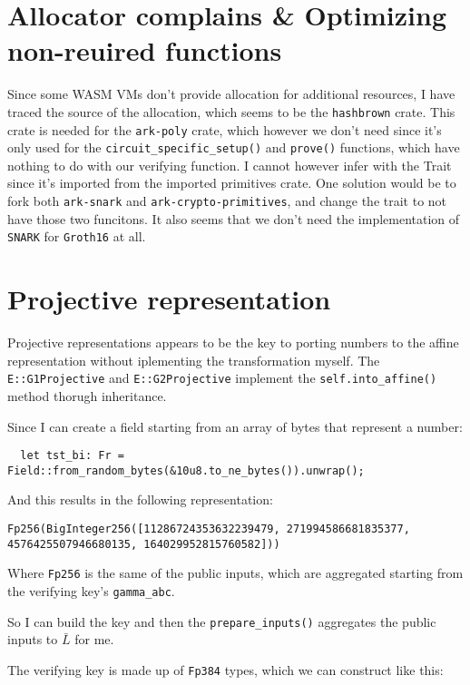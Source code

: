 \documentclass{article}
\newcommand{\inl}[1]{\lstinline{#1}}
\begin{document}
\section{Allocator complains \& Optimizing non-reuired functions}
Since some WASM VMs don't provide allocation for additional resources, I have traced the source of the allocation, which seems to be the \lstinline{hashbrown} crate. This crate is needed for the \lstinline{ark-poly} crate, which however we don't need since it's only used for the \lstinline{circuit_specific_setup()} and \lstinline{prove()} functions, which have nothing to do with our verifying function. I cannot however infer with the Trait since it's imported from the imported primitives crate. One solution would be to fork both \inl{ark-snark} and \inl{ark-crypto-primitives}, and change the trait to not have those two funcitons. It also seems that we don't need the implementation of \inl{SNARK} for \inl{Groth16} at all.


\section{Projective representation}
Projective representations appears to be the key to porting numbers to the affine representation without iplementing the transformation myself. The \inl{E::G1Projective} and \inl{E::G2Projective} implement the \inl{self.into_affine()} method thorugh inheritance.

Since I can create a field starting from an array of bytes that represent a number:
\begin{lstlisting}
  let tst_bi: Fr = Field::from_random_bytes(&10u8.to_ne_bytes()).unwrap();
\end{lstlisting}

And this results in the following representation:

\begin{lstlisting}
Fp256(BigInteger256([11286724353632239479, 271994586681835377, 4576425507946680135, 164029952815760582]))
\end{lstlisting}

Where \inl{Fp256} is the same of the public inputs, which are aggregated starting from the verifying key's \inl{gamma_abc}.

So I can build the key and then the \inl{prepare_inputs()} aggregates the public inputs to \( \bar{L} \) for me.

The verifying key is made up of \inl{Fp384} types, which we can construct like this:
\end{document}
